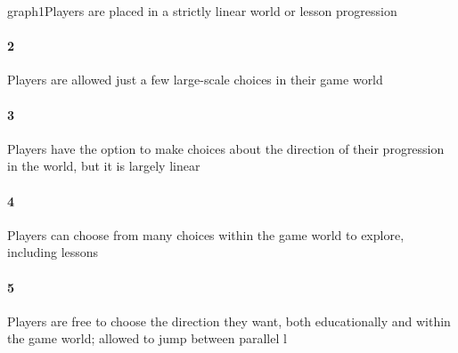 graph{1}Players are placed in a strictly linear world or lesson progression\paragraph{2}Players are allowed just a few large-scale choices in their game world\paragraph{3}Players have the option to make choices about the direction of their progression in the world, but it is largely linear\paragraph{4}Players can choose from many choices within the game world to explore, including lessons\paragraph{5}Players are free to choose the direction they want, both educationally and within the game world; allowed to jump between parallel l
